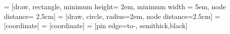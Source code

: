  = [draw, rectangle, minimum height= 2em, minimum width = 5em, node distance= 2.5cm]
 = [draw, circle, radius=2em, node distance=2.5cm]
 = [coordinate]
 = [coordinate]
 = [pin edge={to-, semithick,black}]
